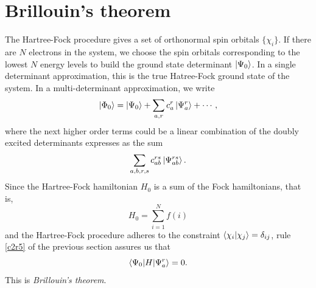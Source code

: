 \section{Brillouin's theorem}\label{c3s4}
The Hartree-Fock procedure gives a set of orthonormal spin orbitals
$\{\chi_i\}$. If there are $N$ electrons in the system, we choose the spin
orbitals corresponding to the lowest $N$ energy levels to build the ground
state determinant $\ket{\Psi_0}$. In a single determinant approximation, this
is the true Hatree-Fock ground state of the system. In a multi-determinant
approximation, we write
\begin{equation}\label{c3e49}
\ket{\Phi_0} = \ket{\Psi_0} + \sum_{a, r}c_a^r\ket{\Psi_a^r} + \cdots,
\end{equation}
where the next higher order terms could be a linear combination of the doubly
excited determinants expresses as the sum
\[
\sum_{a,b,r,s}c_{ab}^{rs}\ket{\Psi_{ab}^{rs}}.
\]
Since the Hartree-Fock hamiltonian $H_0$ is a sum of the Fock hamiltonians,
that is,
\[
H_0 = \sum_{i=1}^N f(i)
\]
and the Hartree-Fock procedure adheres to the constraint
$\braket{\chi_i|\chi_j} = \delta_{ij}$, rule \ref{c2r5} of the previous section
assures us that
\begin{equation}\label{c3e50}
\braket{\Psi_0|H|\Psi_a^r} = 0.
\end{equation}
This is \emph{Brillouin's theorem}.
